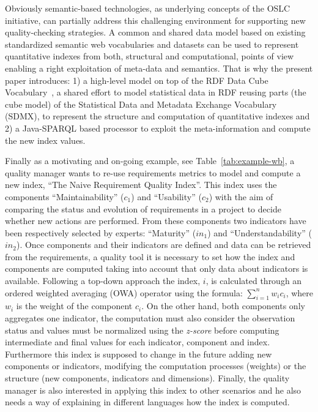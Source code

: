 % 
Obviously semantic-based technologies, as underlying concepts of the OSLC initiative, can partially address this challenging environment for supporting 
new quality-checking strategies. A common and shared data model based on existing standardized semantic web vocabularies and datasets can be used to 
represent quantitative indexes from both, structural and computational, points of view enabling a right exploitation of meta-data and semantics. 
That is why the present paper introduces: 1) a high-level model on top of the RDF Data Cube Vocabulary~\cite{rdf-data-cube}, a shared effort to model statistical data in RDF reusing parts 
(the cube model) of the Statistical Data and Metadata Exchange Vocabulary~\cite{sdmx} (SDMX), to represent the structure and computation of quantitative indexes and 
2) a Java-SPARQL based processor to exploit the meta-information and compute the new index values.
% 

% 
Finally as a motivating and on-going example, see Table~\ref{tab:example-wb}, a quality manager wants to re-use requirements metrics to model and compute a new index, 
``The Naive Requirement Quality Index''. This  index uses the components ``Maintainability'' ($c_1$) and ``Usability'' ($c_2$) with the aim of 
comparing the status and evolution of requirements in a project to decide whether new actions are performed. 
From these components two indicators have been respectively selected by experts: ``Maturity'' ($in_1$) and ``Understandability'' ($in_2$). 
Once components and their indicators are defined and data can be retrieved from the requirements, a quality tool it is necessary to set how the index and 
components are computed taking into account that only data about indicators is available. Following a top-down approach the index, $i$, is calculated through 
an ordered weighted averaging (OWA) operator using the formula: $\sum_{i=1}^n  w_i c_i$, where $w_i$ is the weight of the component $c_i$. On the other hand, 
both components only aggregates one indicator, the computation must also consider the observation status and values must be normalized using the 
\textit{z-score} before computing intermediate and final values for each indicator, component and index. Furthermore this index is supposed to 
change in the future adding new components or indicators, modifying the computation processes (weights) or the structure (new components, indicators and dimensions). 
Finally, the quality manager is also interested in applying this index to other scenarios and he also needs a way of explaining in different 
languages how the index is computed. 


